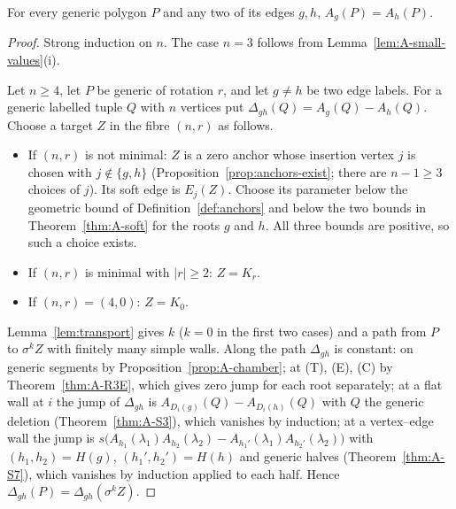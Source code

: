 \begin{theorem}\label{thm:root-indep-proof}
For every generic polygon $P$ and any two of its edges $g,h$, $A_g(P)=A_h(P)$.
\end{theorem}
\begin{proof}
Strong induction on $n$. The case $n=3$ follows from
Lemma~\ref{lem:A-small-values}(i).

Let $n\geq4$, let $P$ be generic of rotation $r$, and let $g\neq h$ be two
edge labels. For a generic labelled tuple $Q$ with $n$ vertices put
$\Delta_{gh}(Q)=A_g(Q)-A_h(Q)$. Choose a target $Z$ in the fibre $(n,r)$ as
follows.
\begin{itemize}
\item If $(n,r)$ is not minimal: $Z$ is a zero anchor whose insertion vertex
$j$ is chosen with $j\notin\{g,h\}$ (Proposition~\ref{prop:anchors-exist};
there are $n-1\geq3$ choices of $j$). Its soft edge is $E_j(Z)$.
Choose its parameter below the geometric bound of
Definition~\ref{def:anchors} and below the two bounds in
Theorem~\ref{thm:A-soft} for the roots $g$ and $h$.
All three bounds are positive, so such a choice exists.
\item If $(n,r)$ is minimal with $|r|\geq2$: $Z=K_r$.
\item If $(n,r)=(4,0)$: $Z=K_0$.
\end{itemize}
Lemma~\ref{lem:transport} gives $k$ ($k=0$ in the first two cases) and a path
from $P$ to $\sigma^kZ$ with finitely many simple walls. Along the path
$\Delta_{gh}$ is constant: on generic segments by
Proposition~\ref{prop:A-chamber}; at (T), (E), (C) by
Theorem~\ref{thm:A-R3E}, which gives zero jump for each root separately; at a
flat wall at $i$ the jump of $\Delta_{gh}$ is
$A_{D_i(g)}(Q)-A_{D_i(h)}(Q)$ with $Q$ the generic deletion
(Theorem~\ref{thm:A-S3}), which vanishes by induction; at a vertex--edge wall
the jump is
$s\bigl(A_{h_1}(\lambda_1)A_{h_2}(\lambda_2)-A_{h_1'}(\lambda_1)A_{h_2'}(\lambda_2)\bigr)$
with $(h_1,h_2)=H(g)$, $(h_1',h_2')=H(h)$ and generic halves
(Theorem~\ref{thm:A-S7}), which vanishes by induction applied to each half.
Hence $\Delta_{gh}(P)=\Delta_{gh}(\sigma^kZ)$.


\end{proof}
